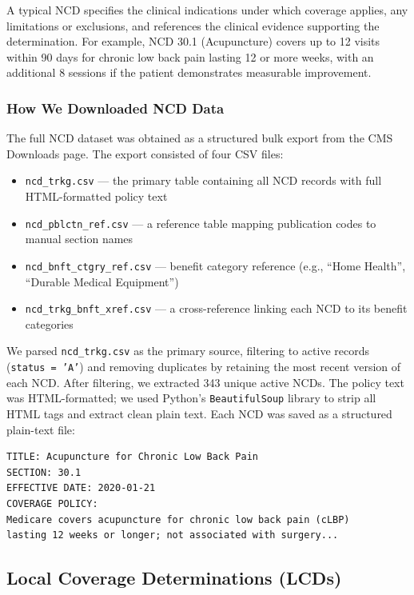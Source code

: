 \documentclass[10pt, letterpaper]{article}
\begin{document}
A typical NCD specifies the clinical indications under which coverage applies, any
limitations or exclusions, and references the clinical evidence supporting the
determination. For example, NCD 30.1 (Acupuncture) covers up to 12 visits within
90 days for chronic low back pain lasting 12 or more weeks, with an additional 8
sessions if the patient demonstrates measurable improvement.
 
\subsubsection{How We Downloaded NCD Data}
 
The full NCD dataset was obtained as a structured bulk export from the CMS Downloads
page. The export consisted of four CSV files:
 
\begin{itemize}[noitemsep, topsep=4pt]
    \item \texttt{ncd\_trkg.csv} --- the primary table containing all NCD records with
          full HTML-formatted policy text
    \item \texttt{ncd\_pblctn\_ref.csv} --- a reference table mapping publication codes
          to manual section names
    \item \texttt{ncd\_bnft\_ctgry\_ref.csv} --- benefit category reference (e.g.,
          ``Home Health'', ``Durable Medical Equipment'')
    \item \texttt{ncd\_trkg\_bnft\_xref.csv} --- a cross-reference linking each NCD
          to its benefit categories
\end{itemize}
 
We parsed \texttt{ncd\_trkg.csv} as the primary source, filtering to active records
(\texttt{status = 'A'}) and removing duplicates by retaining the most recent version
of each NCD. After filtering, we extracted 343 unique active NCDs. The policy text
was HTML-formatted; we used Python's \texttt{BeautifulSoup} library to strip all HTML
tags and extract clean plain text. Each NCD was saved as a structured plain-text file:
 
\begin{verbatim}
TITLE: Acupuncture for Chronic Low Back Pain
SECTION: 30.1
EFFECTIVE DATE: 2020-01-21
COVERAGE POLICY:
Medicare covers acupuncture for chronic low back pain (cLBP)
lasting 12 weeks or longer; not associated with surgery...
\end{verbatim}
 
\subsection{Local Coverage Determinations (LCDs)}
 
\end{document}
